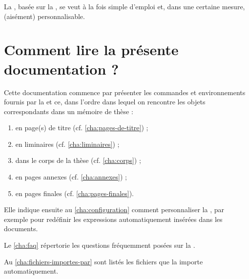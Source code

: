 La \yatcl{}, basée sur la , se veut à la fois simple d'emploi et,
dans une certaine mesure, (aisément) personnalisable.


\section{Comment lire la présente documentation ?}
\label{sec:comment-lire-cette}

Cette documentation commence par présenter les commandes et environnements
fournis par la \yatcl{} et ce, dans l'ordre dans lequel on rencontre les objets
correspondants dans un mémoire de thèse :
\begin{enumerate}
\item en page(s) de titre (cf. \vref{cha:pages-de-titre}) ;
\item en \glspl{liminaire} (cf. \vref{cha:liminaires}) ;
\item dans le corps de la thèse (cf. \vref{cha:corps}) ;
\item en pages annexes (cf. \vref{cha:annexes}) ;
\item en pages finales (cf. \vref{cha:pages-finales}).
\end{enumerate}

Elle indique ensuite au \vref{cha:configuration} comment personnaliser la
\yatcl{}, par exemple pour redéfinir les expressions automatiquement insérées
dans les documents.

Le \vref{cha:faq} répertorie les questions fréquemment posées sur la \yatcl{}.

Au \vref{cha:fichiers-importes-par} sont listés les fichiers que la \yatcl{}
importe automatiquement.

